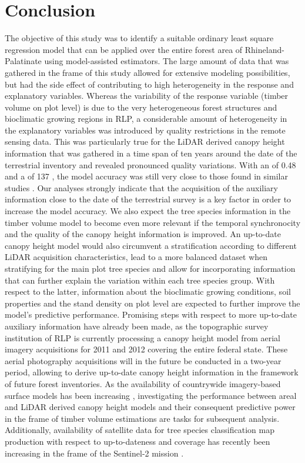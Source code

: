 \section{Conclusion}
\label{sec:concl}

The objective of this study was to identify a suitable ordinary least square regression model that can be applied over the entire forest area of Rhineland-Palatinate using model-assisted estimators. The large amount of data that was gathered in the frame of this study allowed for extensive modeling possibilities, but had the side effect of contributing to high heterogeneity in the response and explanatory variables. Whereas the variability of the response variable (timber volume on plot level) is due to the very heterogeneous forest structures and bioclimatic growing regions in RLP, a considerable amount of heterogeneity in the explanatory variables was introduced by quality restrictions in the remote sensing data. This was particularly true for the LiDAR derived canopy height information that was gathered in a time span of ten years around the date of the terrestrial inventory and revealed pronounced quality variations. With an \adjrsq{} of 0.48 and a \rmsecv{} of 137 \mha{}, the model accuracy was still very close to those found in similar studies \citep{maack2016}. Our analyses strongly indicate that the acquisition of the auxiliary information close to the date of the terrestrial survey is a key factor in order to increase the model accuracy. We also expect the tree species information in the timber volume model to become even more relevant if the temporal synchronocity and the quality of the canopy height information is improved. An up-to-date canopy height model would also circumvent a stratification according to different LiDAR acquisition characteristics, lead to a more balanced dataset when stratifying for the main plot tree species and allow for incorporating information that can further explain the variation within each tree species group. With respect to the latter, information about the bioclimatic growing conditions, soil properties and the stand density on plot level are expected to further improve the model's predictive performance. Promising steps with respect to more up-to-date auxiliary information have already been made, as the topographic survey institution of RLP is currently processing a canopy height model from aerial imagery acquisitions for 2011 and 2012 covering the entire federal state. These aerial photography acquisitions will in the future be conducted in a two-year period, allowing to derive up-to-date canopy height information in the framework of future forest inventories. As the availability of countrywide imagery-based surface models has been increasing \citep{ginzler2015}, investigating the performance between areal and LiDAR derived canopy height models and their consequent predictive power in the frame of timber volume estimations \citep{ullah2017} are tasks for subsequent analysis. Additionally, availability of satellite data for tree species classification map production with respect to up-to-dateness and coverage has recently been increasing in the frame of the Sentinel-2 mission \citep{sentinel2}.